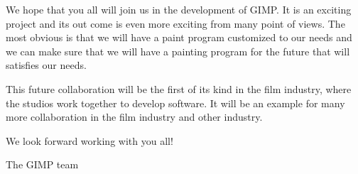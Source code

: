 We hope that you all will join us in the development of GIMP. It is an exciting project and its out come is even more exciting from many point of views. The most obvious is that we will have a paint program customized to our needs and we can make sure that we will have a painting program for the future that will satisfies our needs. 

This future collaboration will be the first of its kind in the film industry, where the studios work together to develop software. It will be an example for many more collaboration in the film industry and other industry.  

We look forward working with you all!

	The GIMP team
 
